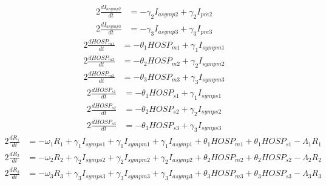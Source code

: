 \documentclass{article}%
\begin{document}
\begin{alignat*}{2}%
\frac{dI_{asymp2}}{dt} &= -\gamma_{2} I_{asymp2} +  \gamma_{2} I_{pre2}%
\end{alignat*}%
\begin{alignat*}{2}%
\frac{dI_{asymp3}}{dt} &= -\gamma_{3} I_{asymp3} +  \gamma_{3} I_{pre3}%
\end{alignat*}%
\begin{alignat*}{2}%
\frac{dHOSP_{m1}}{dt} &= -\theta_{1} HOSP_{m1} +  \gamma_{1} I_{sympm1}%
\end{alignat*}%
\begin{alignat*}{2}%
\frac{dHOSP_{m2}}{dt} &= -\theta_{2} HOSP_{m2} +  \gamma_{2} I_{sympm2}%
\end{alignat*}%
\begin{alignat*}{2}%
\frac{dHOSP_{m3}}{dt} &= -\theta_{3} HOSP_{m3} +  \gamma_{3} I_{sympm3}%
\end{alignat*}%
\begin{alignat*}{2}%
\frac{dHOSP_{s1}}{dt} &= -\theta_{1} HOSP_{s1} +  \gamma_{1} I_{symps1}%
\end{alignat*}%
\begin{alignat*}{2}%
\frac{dHOSP_{s2}}{dt} &= -\theta_{2} HOSP_{s2} +  \gamma_{2} I_{symps2}%
\end{alignat*}%
\begin{alignat*}{2}%
\frac{dHOSP_{s3}}{dt} &= -\theta_{3} HOSP_{s3} +  \gamma_{3} I_{symps3}%
\end{alignat*}%
\begin{alignat*}{2}%
\frac{dR_{1}}{dt} &= -\omega_{1} R_{1} +  \gamma_{1} I_{symps1} +  \gamma_{1} I_{sympm1} +  \gamma_{1} I_{asymp1} +  \theta_{1} HOSP_{m1} +  \theta_{1} HOSP_{s1} -\Lambda_{1} R_{1}%
\end{alignat*}%
\begin{alignat*}{2}%
\frac{dR_{2}}{dt} &= -\omega_{2} R_{2} +  \gamma_{2} I_{symps2} +  \gamma_{2} I_{sympm2} +  \gamma_{2} I_{asymp2} +  \theta_{2} HOSP_{m2} +  \theta_{2} HOSP_{s2} -\Lambda_{2} R_{2}%
\end{alignat*}%
\begin{alignat*}{2}%
\frac{dR_{3}}{dt} &= -\omega_{3} R_{3} +  \gamma_{3} I_{symps3} +  \gamma_{3} I_{sympm3} +  \gamma_{3} I_{asymp3} +  \theta_{3} HOSP_{m3} +  \theta_{3} HOSP_{s3} -\Lambda_{3} R_{3}%
\end{alignat*}%
\end{document}
